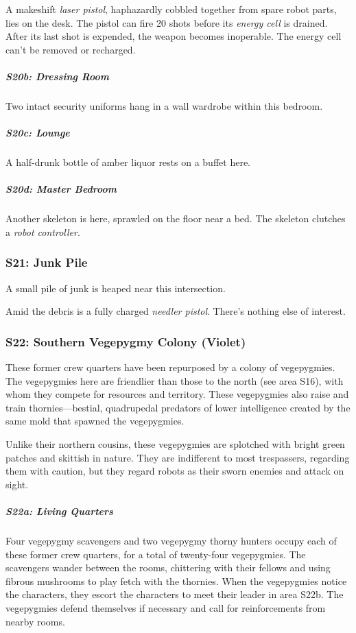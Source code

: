 \documentclass[10pt,a4paper,twoside,bg=print,twocolumn,openany,nodeprecatedcode]{dndbook}
\begin{document}
A makeshift \textit{laser pistol}, haphazardly cobbled together from spare robot parts, lies on the desk. The pistol can fire 20 shots before its \textit{energy cell} is drained. After its last shot is expended, the weapon becomes inoperable. The energy cell can't be removed or recharged.

\subparagraph{S20b: Dressing Room}
Two intact security uniforms hang in a wall wardrobe within this bedroom.

\subparagraph{S20c: Lounge}
A half-drunk bottle of amber liquor rests on a buffet here.

\subparagraph{S20d: Master Bedroom}
Another skeleton is here, sprawled on the floor near a bed. The skeleton clutches a \textit{robot controller}.

\subsubsection{S21: Junk Pile}
A small pile of junk is heaped near this intersection.

Amid the debris is a fully charged \textit{needler pistol}. There's nothing else of interest.

\subsubsection{S22: Southern Vegepygmy Colony (Violet)}
These former crew quarters have been repurposed by a colony of vegepygmies. The vegepygmies here are friendlier than those to the north (see area S16), with whom they compete for resources and territory. These vegepygmies also raise and train thornies—bestial, quadrupedal predators of lower intelligence created by the same mold that spawned the vegepygmies.

Unlike their northern cousins, these vegepygmies are splotched with bright green patches and skittish in nature. They are indifferent to most trespassers, regarding them with caution, but they regard robots as their sworn enemies and attack on sight.

\subparagraph{S22a: Living Quarters}
Four vegepygmy scavengers and two vegepygmy thorny hunters occupy each of these former crew quarters, for a total of twenty-four vegepygmies. The scavengers wander between the rooms, chittering with their fellows and using fibrous mushrooms to play fetch with the thornies. When the vegepygmies notice the characters, they escort the characters to meet their leader in area S22b. The vegepygmies defend themselves if necessary and call for reinforcements from nearby rooms.
\end{document}
